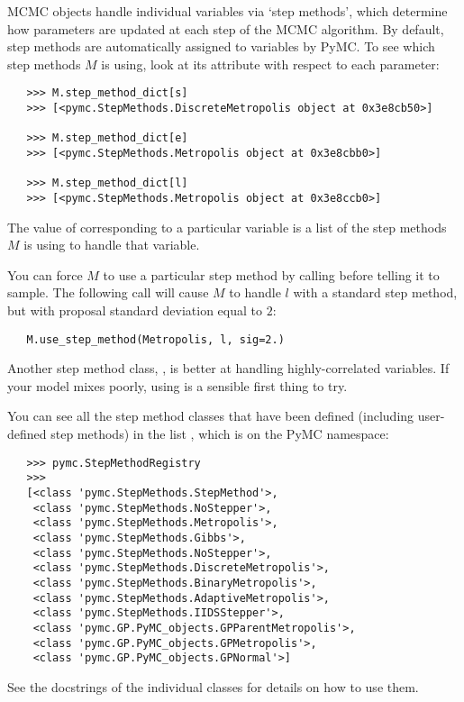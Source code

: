 MCMC objects handle individual variables via `step methods', which determine how parameters are updated at each step of the MCMC algorithm. By default, step methods are automatically assigned to variables by PyMC. To see which step methods $M$ is using, look at its  attribute with respect to each parameter:
\begin{verbatim}
   >>> M.step_method_dict[s]
   >>> [<pymc.StepMethods.DiscreteMetropolis object at 0x3e8cb50>]
   
   >>> M.step_method_dict[e]
   >>> [<pymc.StepMethods.Metropolis object at 0x3e8cbb0>]

   >>> M.step_method_dict[l]
   >>> [<pymc.StepMethods.Metropolis object at 0x3e8ccb0>]
\end{verbatim}
The value of  corresponding to a particular variable is a list of the step methods $M$ is using to handle that variable. 

You can force $M$ to use a particular step method by calling  before telling it to sample. The following call will cause $M$ to handle $l$ with a standard  step method, but with proposal standard deviation equal to $2$:
\begin{verbatim}
   M.use_step_method(Metropolis, l, sig=2.)
\end{verbatim}

Another step method class, , is better at handling highly-correlated variables. If your model mixes poorly, using  is a sensible first thing to try.

You can see all the step method classes that have been defined (including user-defined step methods) in the list , which is on the PyMC namespace: 
\begin{verbatim}
   >>> pymc.StepMethodRegistry
   >>> 
   [<class 'pymc.StepMethods.StepMethod'>,
    <class 'pymc.StepMethods.NoStepper'>,
    <class 'pymc.StepMethods.Metropolis'>,
    <class 'pymc.StepMethods.Gibbs'>,
    <class 'pymc.StepMethods.NoStepper'>,
    <class 'pymc.StepMethods.DiscreteMetropolis'>,
    <class 'pymc.StepMethods.BinaryMetropolis'>,
    <class 'pymc.StepMethods.AdaptiveMetropolis'>,
    <class 'pymc.StepMethods.IIDSStepper'>,
    <class 'pymc.GP.PyMC_objects.GPParentMetropolis'>,
    <class 'pymc.GP.PyMC_objects.GPMetropolis'>,
    <class 'pymc.GP.PyMC_objects.GPNormal'>]
\end{verbatim}
See the docstrings of the individual classes for details on how to use them.

